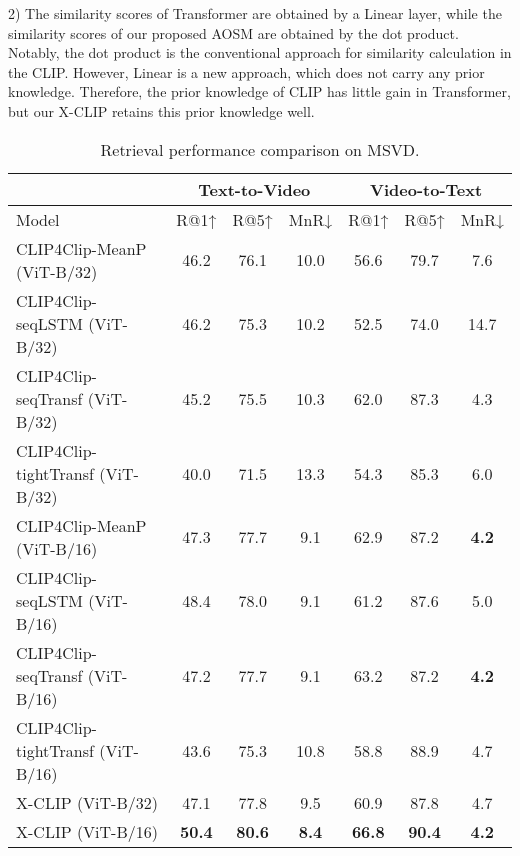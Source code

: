 \documentclass[sigconf]{acmart}
\begin{document}
2) The similarity scores of Transformer are obtained by a Linear layer, while the similarity scores of our proposed AOSM are obtained by the dot product. Notably, the dot product is the conventional approach for similarity calculation in the CLIP. However, Linear is a new approach, which does not carry any prior knowledge. Therefore, the prior knowledge of CLIP has little gain in Transformer, but our X-CLIP retains this prior knowledge well.







\begin{table*}[]
\caption{Retrieval performance comparison on MSVD.}
\begin{tabular}{l|ccc|ccc}
\hline
              & \multicolumn{3}{c|}{Text-to-Video }                                 & \multicolumn{3}{c}{Video-to-Text }                                 \\
              \hline
Model      & R@1↑          & R@5↑                 & MnR↓          & R@1↑          & R@5↑                   & MnR↓          \\ \hline
CLIP4Clip-MeanP (ViT-B/32)  & 46.2          & 76.1          & 10.0         & 56.6          & 79.7          & 7.6          \\
CLIP4Clip-seqLSTM (ViT-B/32)      & 46.2 & 75.3 & 10.2 & 52.5 & 74.0 & 14.7 \\
CLIP4Clip-seqTransf (ViT-B/32)    & 45.2 & 75.5 & 10.3 & 62.0 & 87.3 & 4.3  \\
CLIP4Clip-tightTransf (ViT-B/32)   & 40.0 & 71.5 & 13.3 & 54.3 & 85.3 & 6.0  \\
CLIP4Clip-MeanP (ViT-B/16)  & 47.3 & 77.7 & 9.1 & 62.9 & 87.2 & \textbf{4.2} \\ 
CLIP4Clip-seqLSTM (ViT-B/16)  & 48.4 & 78.0 & 9.1 & 61.2 & 87.6 & 5.0 \\ 
CLIP4Clip-seqTransf (ViT-B/16)    & 47.2 & 77.7 & 9.1 & 63.2 & 87.2 & \textbf{4.2}  \\
CLIP4Clip-tightTransf (ViT-B/16)    & 43.6 & 75.3 & 10.8 & 58.8 & 88.9 & 4.7  \\
\hline
X-CLIP (ViT-B/32)    & 47.1          & 77.8          & 9.5          & 60.9          & 87.8          & 4.7          \\
X-CLIP (ViT-B/16)    & \textbf{50.4} & \textbf{80.6} & \textbf{8.4} & \textbf{66.8} & \textbf{90.4} & \textbf{4.2} \\ \hline
\end{tabular}
\label{tab:msvd_performance2}
\end{table*}
\end{document}
